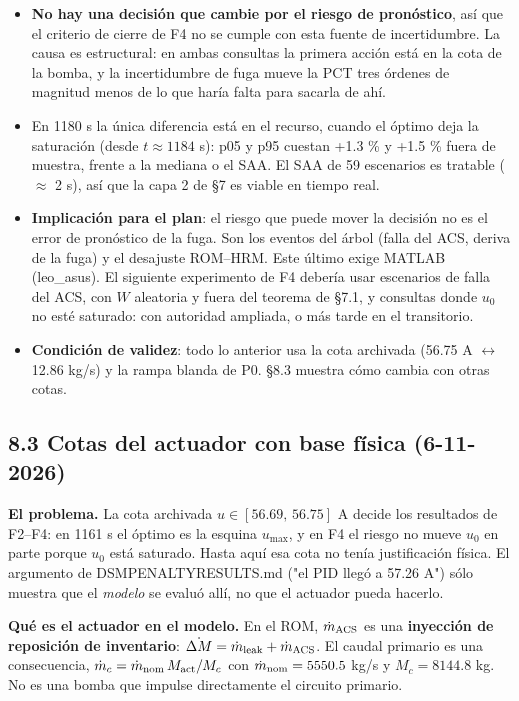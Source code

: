 \documentclass[11pt,a4paper]{article}
\newcommand{\codeus}{\textunderscore\allowbreak}
\newcommand{\code}[1]{{\small\ttfamily\let\_\codeus #1}}
\begin{document}
\begin{itemize}
\item \textbf{No hay una decisión que cambie por el riesgo de pronóstico}, así que el criterio de cierre de F4 no se cumple con esta fuente de incertidumbre. La causa es estructural: en ambas consultas la primera acción está en la cota de la bomba, y la incertidumbre de fuga mueve la PCT tres órdenes de magnitud menos de lo que haría falta para sacarla de ahí.
\item En 1180 s la única diferencia está en el recurso, cuando el óptimo deja la saturación (desde $t\approx1184$ s): p05 y p95 cuestan +1.3 \% y +1.5 \% fuera de muestra, frente a la mediana o el SAA. El SAA de 59 escenarios es tratable ($\approx$ 2 s), así que la capa 2 de \S{}7 es viable en tiempo real.
\item \textbf{Implicación para el plan}: el riesgo que puede mover la decisión no es el error de pronóstico de la fuga. Son los eventos del árbol (falla del ACS, deriva de la fuga) y el desajuste ROM–HRM. Este último exige MATLAB (leo\_asus). El siguiente experimento de F4 debería usar escenarios de falla del ACS, con $W$ aleatoria y fuera del teorema de \S{}7.1, y consultas donde $u_0$ no esté saturado: con autoridad ampliada, o más tarde en el transitorio.
\item \textbf{Condición de validez}: todo lo anterior usa la cota archivada (56.75 A $\leftrightarrow$ 12.86 kg/s) y la rampa blanda de P0. \S{}8.3 muestra cómo cambia con otras cotas.
\end{itemize}

\subsection*{8.3 Cotas del actuador con base física (6-11-2026)}
\textbf{El problema.} La cota archivada $u\in[56.69,\,56.75]$ A decide los resultados de F2–F4: en 1161 s el óptimo es la esquina $u_{\max}$, y en F4 el riesgo no mueve $u_0$ en parte porque $u_0$ está saturado. Hasta aquí esa cota no tenía justificación física. El argumento de \code{DSM\_PENALTY\_RESULTS.md} ("el PID llegó a 57.26 A") sólo muestra que el \emph{modelo} se evaluó allí, no que el actuador pueda hacerlo.

\textbf{Qué es el actuador en el modelo.} En el ROM, $\dot m_{\rm ACS}$ es una \textbf{inyección de reposición de inventario}: $\dot{\Delta M}=\dot m_{\rm leak}+\dot m_{\rm ACS}$. El caudal primario es una consecuencia, $\dot m_c=\dot m_{\rm nom}\,M_{\rm act}/M_c$ con $\dot m_{\rm nom}=5550.5$ kg/s y $M_c=8144.8$ kg. No es una bomba que impulse directamente el circuito primario.
\end{document}
